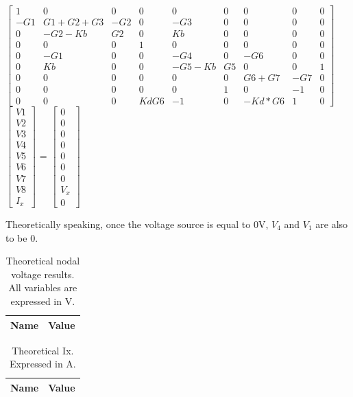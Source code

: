 $\begin{bmatrix}
1 & 0 & 0 & 0 & 0 & 0 & 0 & 0 & 0\\
-G1 & G1+G2+G3 & -G2 & 0 & -G3 & 0 & 0 & 0 & 0\\
0 & -G2-Kb & G2 & 0 & Kb & 0 & 0 & 0 & 0\\
0 & 0 & 0 & 1 & 0 & 0 & 0 & 0 & 0\\
0 & -G1 & 0 & 0 & -G4 & 0 & -G6 & 0 & 0\\
0 & Kb & 0 & 0 & -G5-Kb & G5 & 0 & 0 & 1\\
0 & 0 & 0 & 0 & 0 & 0 & G6+G7& -G7 & 0\\
0 & 0 & 0 & 0 & 0 & 1 & 0 & -1 & 0\\
0 & 0 & 0 & KdG6 & -1 & 0 & -Kd*G6 & 1 & 0
\end{bmatrix}$
$\begin{bmatrix}
V1 \\ V2 \\ V3 \\ V4 \\ V5 \\ V6 \\ V7 \\ V8 \\ I_{x}
\end{bmatrix}$
= 
$\begin{bmatrix}
0 \\ 0 \\ 0 \\ 0 \\ 0 \\ 0 \\ 0 \\ V_{x} \\ 0
\end{bmatrix}$

\par Theoretically speaking, once the voltage source is equal to 0V, $V_{4}$ and  $V_{1}$ are also to be 0. 

\begin{table}[ht]
  \centering
  \begin{tabular}{|l|r|}
    \hline    
    {\bf Name} & {\bf Value} \\ \hline
    
  \end{tabular}
  \caption{Theoretical nodal voltage results. All variables are expressed in V.}
  \label{tab:p2}
\end{table}

\begin{table}[ht]
  \centering
  \begin{tabular}{|l|r|}
    \hline    
    {\bf Name} & {\bf Value} \\ \hline
    
  \end{tabular}
  \caption{Theoretical Ix. Expressed in A.}
  \label{tab:p2}
\end{table}

